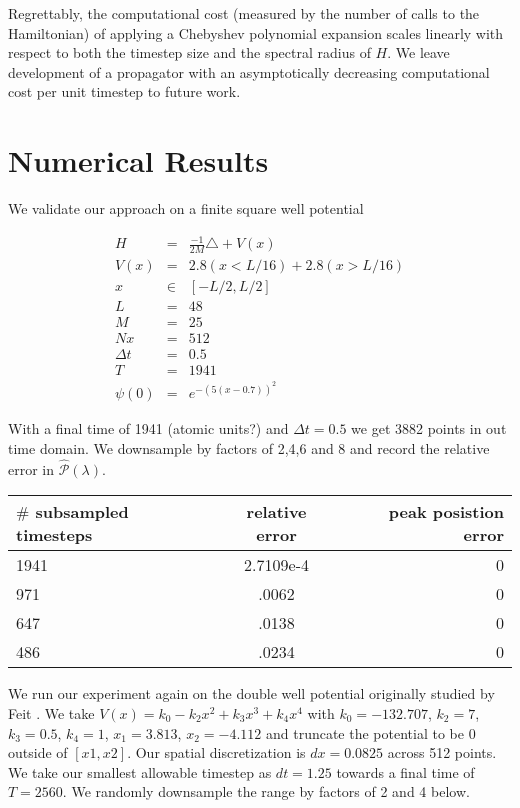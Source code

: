 \documentclass[10pt]{amsart}
\theoremstyle{remark}
\begin{document}
Regrettably, the computational cost (measured by the number of calls to the Hamiltonian) of applying a Chebyshev polynomial expansion scales linearly with respect to both the timestep size and the spectral radius of $H$. We leave development of a propagator with an asymptotically decreasing computational cost per unit timestep to future work.

\section{Numerical Results}

We validate our approach on a finite square well potential

\begin{eqnarray*}
H &=& \frac{-1}{2M}\triangle + V(x) \\
V(x) &=& 2.8(x < L/16) + 2.8(x > L/16) \\ 
x &\in & [-L/2, L/2] \\
L &=& 48\\
M &=& 25\\
Nx &=& 512 \\
\Delta t &=& 0.5 \\
T &=& 1941 \\
\psi(0) &=& e^{-(5(x-0.7))^2}
\end{eqnarray*}

With a final time of 1941 (atomic units?) and $\Delta t = 0.5$ we get 3882 points in out time domain. We downsample by factors of 2,4,6 and 8 and record the relative error in  $\hat{\mathcal{P}}(\lambda)$.


\begin{center}
\begin{tabular}{ l |c| r  }
  \hline                       
  $\#$ subsampled timesteps & relative error &peak posistion error\\ \hline
   1941 & 2.7109e-4 & 0\\
   971 & .0062 & 0\\
   647 & .0138 & 0\\
   486 &  .0234 & 0\\
  \hline  
\end{tabular}
\end{center}

We run our experiment again on the double well potential originally studied by Feit \cite{FEIT1982}. We take $V(x) = k_0 - k_2x^2 + k_3x^3 + k_4x^4$ with $k_0=-132.707$, $k_2=7$, $k_3=0.5$, $k_4=1$, $x_1=3.813$, $x_2=-4.112$ and truncate the potential to be 0 outside of $[x1,x2]$. Our spatial discretization is $dx=0.0825$ across 512 points. We take our smallest allowable timestep as $dt=1.25$ towards a final time of $T=2560$. We randomly downsample the range by factors of 2 and 4 below.
\end{document}
